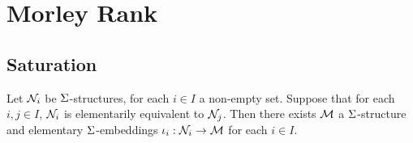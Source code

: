\section{Morley Rank}
\subsection{Saturation}

\begin{prop}
    Let $\mathcal{N}_i$ be $\Sigma$-structures, 
    for each $i \in I$ a non-empty set.
    Suppose that for each $i, j \in I$, 
    $\mathcal{N}_i$ is elementarily equivalent to $\mathcal{N}_j$.
    Then there exists $\mathcal{M}$ a $\Sigma$-structure and elementary $\Sigma$-embeddings 
    $\iota_i : \mathcal{N}_i \to \mathcal{M}$ for each $i \in I$.
\end{prop}
